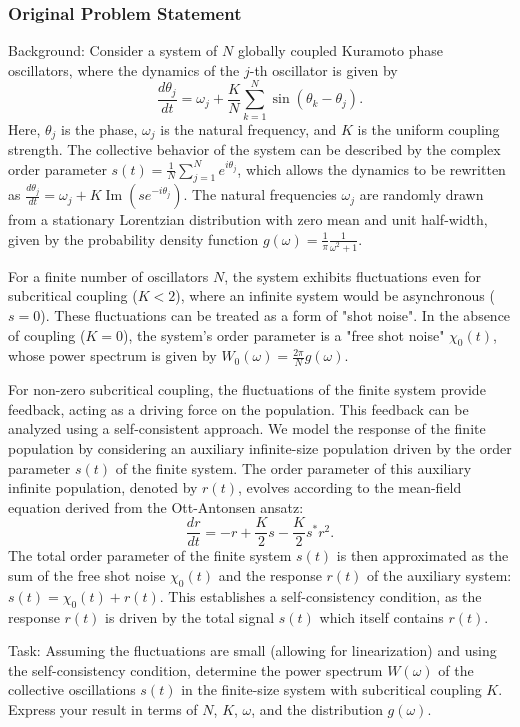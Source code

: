 \documentclass[10pt]{article}
\begin{document}
\subsubsection*{Original Problem Statement}
Background:
Consider a system of $N$ globally coupled Kuramoto phase oscillators, where the dynamics of the $j$-th oscillator is given by
$$ \frac{d\theta_j}{dt} = \omega_j + \frac{K}{N}\sum_{k=1}^N \sin(\theta_k - \theta_j). $$
Here, $\theta_j$ is the phase, $\omega_j$ is the natural frequency, and $K$ is the uniform coupling strength. The collective behavior of the system can be described by the complex order parameter $s(t) = \frac{1}{N} \sum_{j=1}^N e^{i \theta_j}$, which allows the dynamics to be rewritten as $\frac{d\theta_j}{dt} = \omega_j + K \operatorname{Im}(s e^{-i\theta_j})$. The natural frequencies $\omega_j$ are randomly drawn from a stationary Lorentzian distribution with zero mean and unit half-width, given by the probability density function $g(\omega) = \frac{1}{\pi}\frac{1}{\omega^2+1}$.

For a finite number of oscillators $N$, the system exhibits fluctuations even for subcritical coupling ($K<2$), where an infinite system would be asynchronous ($s=0$). These fluctuations can be treated as a form of "shot noise". In the absence of coupling ($K=0$), the system's order parameter is a "free shot noise" $\chi_0(t)$, whose power spectrum is given by $W_0(\omega) = \frac{2\pi}{N}g(\omega)$.

For non-zero subcritical coupling, the fluctuations of the finite system provide feedback, acting as a driving force on the population. This feedback can be analyzed using a self-consistent approach. We model the response of the finite population by considering an auxiliary infinite-size population driven by the order parameter $s(t)$ of the finite system. The order parameter of this auxiliary infinite population, denoted by $r(t)$, evolves according to the mean-field equation derived from the Ott-Antonsen ansatz:
$$ \frac{dr}{dt} = -r + \frac{K}{2}s - \frac{K}{2}s^* r^2. $$
The total order parameter of the finite system $s(t)$ is then approximated as the sum of the free shot noise $\chi_0(t)$ and the response $r(t)$ of the auxiliary system: $s(t) = \chi_0(t) + r(t)$. This establishes a self-consistency condition, as the response $r(t)$ is driven by the total signal $s(t)$ which itself contains $r(t)$.

Task:
Assuming the fluctuations are small (allowing for linearization) and using the self-consistency condition, determine the power spectrum $W(\omega)$ of the collective oscillations $s(t)$ in the finite-size system with subcritical coupling $K$. Express your result in terms of $N$, $K$, $\omega$, and the distribution $g(\omega)$.
\end{document}
